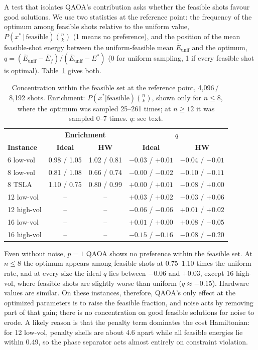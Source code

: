 \documentclass[conference]{IEEEtran}
\begin{document}
A test that isolates QAOA's contribution asks whether the feasible
shots favour good solutions. We use two statistics at the reference
point: the frequency of the optimum among feasible shots relative to the
uniform value, $P(x^*\,|\,\mathrm{feasible})\binom{n}{k}$ (1 means no
preference), and the position of the mean feasible-shot energy between
the uniform-feasible mean $\bar{E}_\mathrm{unif}$ and the optimum,
$q = (\bar{E}_\mathrm{unif} - \bar{E}_f)/(\bar{E}_\mathrm{unif} - E^*)$
(0 for uniform sampling, 1 if every feasible shot is optimal).
Table~\ref{tab:sq} gives both.

\begin{table}[htbp]
\caption{Concentration within the feasible set at the reference point,
4{,}096\,/\,8{,}192 shots. Enrichment:
$P(x^*|\mathrm{feasible})\binom{n}{k}$, shown only for $n{\le}8$, where the
optimum was sampled 25--261 times; at $n{\ge}12$ it was sampled 0--7
times. $q$: see text.}
\label{tab:sq}
\begin{center}
\setlength{\tabcolsep}{3.5pt}
\begin{tabular}{@{}lcccc@{}}
\toprule
& \multicolumn{2}{c}{\textbf{Enrichment}} & \multicolumn{2}{c}{$q$} \\
\textbf{Instance} & \textbf{Ideal} & \textbf{HW} & \textbf{Ideal} & \textbf{HW} \\
\midrule
6 low-vol   & 0.98 / 1.05 & 1.02 / 0.81 & $-0.03$ / $+0.01$ & $-0.04$ / $-0.01$ \\
8 low-vol   & 0.81 / 1.08 & 0.66 / 0.74 & $-0.00$ / $-0.02$ & $-0.10$ / $-0.11$ \\
8 TSLA      & 1.10 / 0.75 & 0.80 / 0.99 & $+0.00$ / $+0.01$ & $-0.08$ / $+0.00$ \\
12 low-vol  & -- & -- & $+0.03$ / $+0.02$ & $-0.03$ / $+0.06$ \\
12 high-vol & -- & -- & $-0.06$ / $-0.06$ & $+0.01$ / $+0.02$ \\
16 low-vol  & -- & -- & $+0.01$ / $+0.00$ & $+0.08$ / $-0.05$ \\
16 high-vol & -- & -- & $-0.15$ / $-0.16$ & $-0.08$ / $-0.20$ \\
\bottomrule
\end{tabular}
\end{center}
\end{table}

Even without noise, $p{=}1$ QAOA shows no preference within the
feasible set. At $n{\le}8$ the optimum appears among feasible shots at
0.75--1.10 times the uniform rate, and at every size the ideal $q$ lies
between $-0.06$ and $+0.03$, except 16 high-vol, where feasible shots are
slightly worse than uniform ($q\approx-0.15$). Hardware values are
similar. On these instances, therefore, QAOA's only effect at the
optimized parameters is to raise the feasible fraction, and noise acts
by removing part of that gain; there is no concentration on good
feasible solutions for noise to erode. A likely reason is that the
penalty term dominates the cost Hamiltonian: for 12 low-vol, penalty
shells are about 4.6 apart while all feasible energies lie within 0.49,
so the phase separator acts almost entirely on constraint violation.
\end{document}
